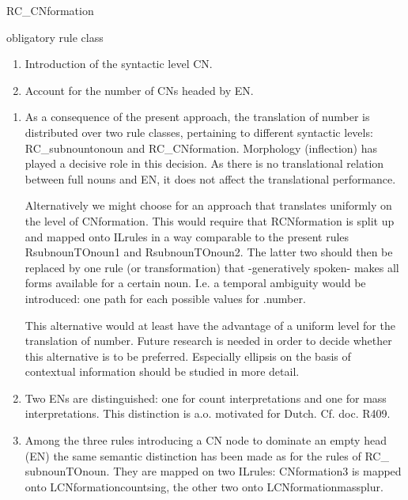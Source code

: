 \begin{mruleclass}{RC\_CNformation}
\begin{classdescr}
\kind obligatory rule class
\classtask
 \begin{enumerate}
  \item 
Introduction of  the syntactic level CN.
  \item
Account for the number of CNs headed by EN.
\end{enumerate}

\classremarks\mbox{}
\begin{enumerate}
  \item 

As a consequence of the present approach, the translation of 
number is distributed over two rule classes, pertaining to different
syntactic levels: RC\_subnountonoun and RC\_CNformation.
Morphology (inflection) has played a decisive role
in this decision. As
 there is no translational relation between full nouns and EN, 
it does not
affect the translational performance.

Alternatively we might choose for an approach that translates uniformly on the
level of CNformation. This would require that RCNformation is split up and 
mapped onto ILrules in a way comparable to the present rules RsubnounTOnoun1 
and RsubnounTOnoun2. The latter two should then be replaced by one rule
(or transformation) that -generatively spoken- makes all 
forms available for 
a certain noun. I.e. 
a temporal ambiguity would be introduced: one path for
each possible values for .number.

This alternative would at least have the advantage of 
a uniform level for the translation of number.
Future research is needed in order to decide whether this alternative is 
to be preferred. Especially ellipsis on the basis of contextual information
should be studied in more detail.
 
 \item Two ENs are distinguished: one for count interpretations and one for 
mass interpretations. This distinction is a.o. motivated for Dutch. Cf. doc. 
R409.
  \item
Among the three rules introducing a CN node to dominate an empty head (EN) 
the same semantic distinction has been made as for the rules of RC\_
subnounTOnoun.
They are mapped on two ILrules: 
CNformation3 is  mapped onto LCNformationcountsing, the other two
onto 
LCNformationmassplur.

\end{enumerate}


\end{classdescr}
\end{mruleclass}
